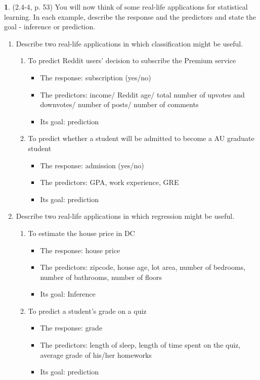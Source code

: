 \documentclass[12pt]{article}
\theoremstyle{definition}
\newtheorem{problem}{}
\begin{document}
	\begin{problem}(2.4-4, p. 53) You will now think of some real-life applications for statistical learning. In each example, describe the response and the predictors and state the goal - inference or prediction.
		\begin{enumerate}
			\item Describe two real-life applications in which classification might be useful.
				\begin{enumerate}
					\item To predict Reddit users' decision to subscribe the Premium service
						\begin{itemize}
							\item The response: subscription (yes/no)
							\item The predictors: income/ Reddit age/ total number of upvotes and downvotes/ number of posts/ number of comments
							\item Its goal: prediction
						\end{itemize}
					\item To predict whether a student will be admitted to become a AU graduate student
						\begin{itemize}
							\item The response: admission (yes/no)
							\item The predictors: GPA, work experience, GRE
							\item Its goal: prediction						
						\end{itemize}
				\end{enumerate}
			
			\item Describe two real-life applications in which regression might be useful.
				\begin{enumerate}
					\item To estimate the house price in DC
						\begin{itemize}
							\item The response: house price
							\item The predictors: zipcode, house age, lot area, number of bedrooms, number of bathrooms, number of floors
							\item Its goal: Inference						
						\end{itemize}
					\item To predict a student's grade on a quiz
						\begin{itemize}
							\item The response: grade
							\item The predictors: length of sleep, length of time spent on the quiz, average grade of his/her homeworks
							\item Its goal: prediction						
						\end{itemize}
				\end{enumerate}


\end{enumerate}
\end{problem}
\end{document}
